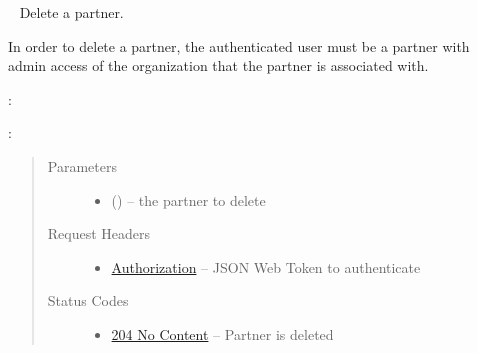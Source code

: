 \documentclass[letterpaper,10pt,english]{sphinxmanual}
\begin{document}
\begin{fulllineitems}
\label{\detokenize{resources/partner:delete--partners-(partner_id)}}~
Delete a partner.

In order to delete a partner, the authenticated user must be a partner
with admin access of the organization that the partner is associated
with.

:

\begin{sphinxVerbatim}[commandchars=\\\{\}]
  
 
 
\end{sphinxVerbatim}

:

\begin{sphinxVerbatim}[commandchars=\\\{\}]
  
\end{sphinxVerbatim}
\begin{quote}\begin{description}
\item[{Parameters}] \leavevmode\begin{itemize}
\item {} 
 () -- the partner to delete

\end{itemize}

\item[{Request Headers}] \leavevmode\begin{itemize}
\item {} 
\href{http://tools.ietf.org/html/rfc7235\#section-4.2}{Authorization} -- JSON Web Token to authenticate

\end{itemize}

\item[{Status Codes}] \leavevmode\begin{itemize}
\item {} 
\href{http://www.w3.org/Protocols/rfc2616/rfc2616-sec10.html\#sec10.2.5}{204 No Content} -- Partner is deleted


\end{itemize}
\end{description}
\end{quote}
\end{fulllineitems}
\end{document}
